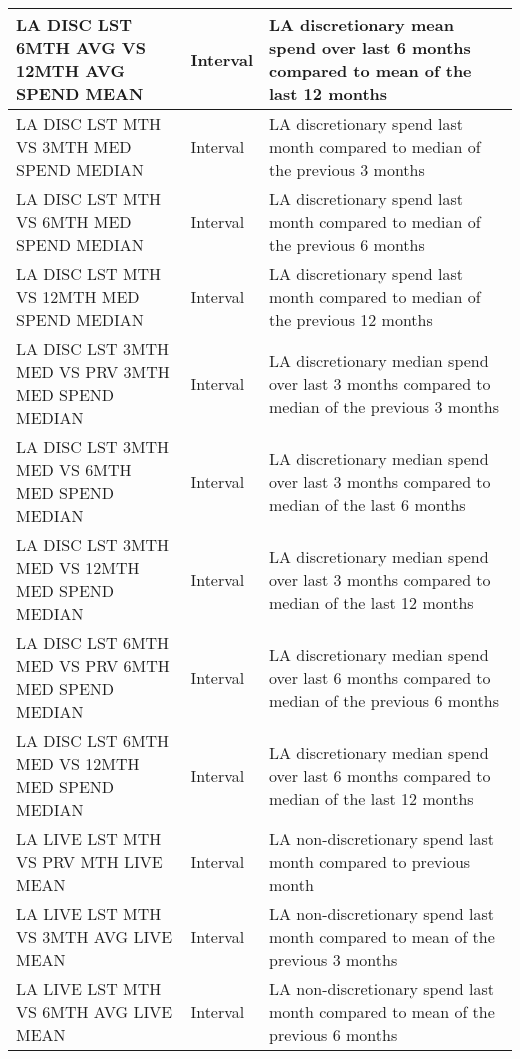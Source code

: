 \begin{longtable}{|p{5.5cm}|l|p{6.5cm}|}
	LA DISC LST 6MTH AVG VS 12MTH AVG SPEND MEAN       & Interval           & LA discretionary mean spend over last 6 months compared to mean of the last 12 months            \\ \hline
	LA DISC LST MTH VS 3MTH MED SPEND MEDIAN            & Interval           & LA discretionary spend last month compared to median of the previous 3 months                    \\ \hline
	LA DISC LST MTH VS 6MTH MED SPEND MEDIAN            & Interval           & LA discretionary spend last month compared to median of the previous 6 months                    \\ \hline
	LA DISC LST MTH VS 12MTH MED SPEND MEDIAN           & Interval           & LA discretionary spend last month compared to median of the previous 12 months                   \\ \hline
	LA DISC LST 3MTH MED VS PRV 3MTH MED SPEND MEDIAN & Interval           & LA discretionary median spend over last 3 months compared to median of the previous 3 months     \\ \hline
	LA DISC LST 3MTH MED VS 6MTH MED SPEND MEDIAN      & Interval           & LA discretionary median spend over last 3 months compared to median of the last 6 months         \\ \hline
	LA DISC LST 3MTH MED VS 12MTH MED SPEND MEDIAN     & Interval           & LA discretionary median spend over last 3 months compared to median of the last 12 months        \\ \hline
	LA DISC LST 6MTH MED VS PRV 6MTH MED SPEND MEDIAN & Interval           & LA discretionary median spend over last 6 months compared to median of the previous 6 months     \\ \hline
	LA DISC LST 6MTH MED VS 12MTH MED SPEND MEDIAN     & Interval           & LA discretionary median spend over last 6 months compared to median of the last 12 months        \\ \hline
	LA LIVE LST MTH VS PRV MTH LIVE MEAN                & Interval           & LA non-discretionary spend last month compared to previous month                                 \\ \hline
	LA LIVE LST MTH VS 3MTH AVG LIVE MEAN               & Interval           & LA non-discretionary spend last month compared to mean of the previous 3 months                  \\ \hline
	LA LIVE LST MTH VS 6MTH AVG LIVE MEAN               & Interval           & LA non-discretionary spend last month compared to mean of the previous 6 months                  \\ \hline

\end{longtable}
